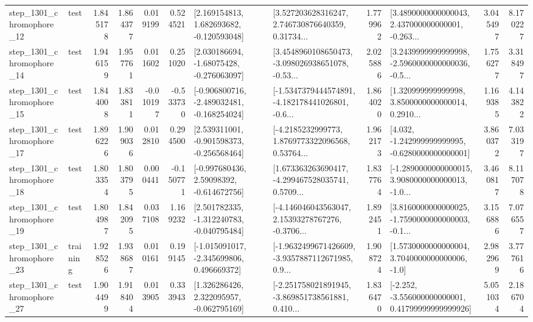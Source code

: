 \begin{tabular}{llrrrrllrlrr}
 step\_1301\_chromophore\_12 &      test &      1.845178 &    1.864377 &      0.019199 &  0.524521 &    [2.169154813, 1.682693682, -0.120593048] &  [3.527203628316247, 2.746730876640359, 0.31734... &       1.779962 &  [3.4890000000000043, 2.437000000000001, -0.263... &            3.045497 &          8.170227 \\
 step\_1301\_chromophore\_14 &      test &      1.946159 &    1.957761 &      0.011602 &  0.251020 &    [2.030186694, -1.68075428, -0.276063097] &  [3.4548960108650473, -3.098026938651078, -0.53... &       2.025886 &  [3.2439999999999998, -2.5960000000000036, -0.5... &            1.756277 &          3.318497 \\
 step\_1301\_chromophore\_15 &      test &      1.844008 &    1.833811 &     -0.010197 & -0.533730 &  [-0.906800716, -2.489032481, -0.168254024] &  [-1.5347379444574891, -4.182178441026801, -0.6... &       1.864020 &  [1.320999999999998, 3.8500000000000014, 0.2910... &            1.169385 &          4.143822 \\
 step\_1301\_chromophore\_17 &      test &      1.896226 &    1.909036 &      0.012810 &  0.294500 &   [2.539311001, -0.901598373, -0.256568464] &  [-4.2185232999773, 1.8769773322096568, 0.53764... &       1.962173 &   [4.032, -1.242999999999995, -0.6280000000000001] &            3.860372 &          7.033197 \\
 step\_1301\_chromophore\_18 &      test &      1.803354 &    1.803795 &      0.000441 & -0.150771 &    [-0.997680436, 2.59098392, -0.614672756] &  [1.673363263690417, -4.299467528035741, 0.5709... &       1.837764 &  [-1.2890000000000015, 3.9080000000000013, -1.0... &            3.460817 &          8.117078 \\
 step\_1301\_chromophore\_19 &      test &      1.804987 &    1.842095 &      0.037108 &  1.169232 &   [2.501782335, -1.312240783, -0.040795484] &  [-4.146046043563047, 2.15393278767276, -0.3706... &       1.892451 &  [3.8160000000000025, -1.7590000000000003, -0.1... &            3.156886 &          7.076557 \\
 step\_1301\_chromophore\_23 &  training &      1.928526 &    1.938687 &      0.010161 &  0.199145 &   [-1.015091017, -2.345699806, 0.496669372] &  [-1.9632499671426609, -3.9357887112671985, 0.9... &       1.908724 &     [1.5730000000000004, 3.7040000000000006, -1.0] &            2.982969 &          3.777616 \\
 step\_1301\_chromophore\_27 &      test &      1.904499 &    1.918404 &      0.013905 &  0.333943 &    [1.326286426, 2.322095957, -0.062795169] &  [-2.251758021891945, -3.869851738561881, 0.410... &       1.836470 &  [-2.252, -3.556000000000001, 0.41799999999999926] &            5.051034 &          2.186704 \\

\end{tabular}
